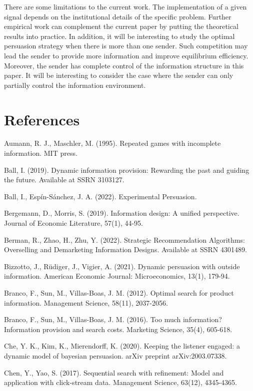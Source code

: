 \documentclass[11pt]{extarticle}
\begin{document}
There are some limitations to the current work. The implementation of a given signal depends on the institutional details of the specific problem. Further empirical work can complement the current paper by putting the theoretical results into practice. In addition, it will be interesting to study the optimal persuasion strategy when there is more than one sender. Such competition may lead the sender to provide more information and improve equilibrium efficiency. Moreover, the sender has complete control of the information structure in this paper. It will be interesting to consider the case where the sender can only partially control the information environment.



\newpage
\section*{References}
\vspace{-10pt}
Aumann, R. J., Maschler, M. (1995). Repeated games with incomplete information. MIT press.

Ball, I. (2019). Dynamic information provision: Rewarding the past and guiding the future. Available at SSRN 3103127.

Ball, I., Espín-Sánchez, J. A. (2022). Experimental Persuasion.

Bergemann, D., Morris, S. (2019). Information design: A unified perspective. Journal of Economic Literature, 57(1), 44-95.

Berman, R., Zhao, H., Zhu, Y. (2022). Strategic Recommendation Algorithms: Overselling and Demarketing Information Designs. Available at SSRN 4301489.

Bizzotto, J., Rüdiger, J., Vigier, A. (2021). Dynamic persuasion with outside information. American Economic Journal: Microeconomics, 13(1), 179-94.

Branco, F., Sun, M., Villas-Boas, J. M. (2012). Optimal search for product information. Management Science, 58(11), 2037-2056.

Branco, F., Sun, M., Villas-Boas, J. M. (2016). Too much information? Information provision and search costs. Marketing Science, 35(4), 605-618.

Che, Y. K., Kim, K., Mierendorff, K. (2020). Keeping the listener engaged: a dynamic model of bayesian persuasion. arXiv preprint arXiv:2003.07338.

Chen, Y., Yao, S. (2017). Sequential search with refinement: Model and application with click-stream data. Management Science, 63(12), 4345-4365.
\end{document}
